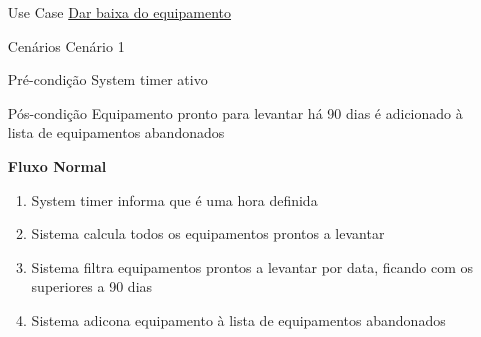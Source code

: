\documentclass[../relatorio.tex]{subfiles}
\begin{document}
\begin{itemize}
    \item[Use Case] {\underline{Dar baixa do equipamento}}
    \item[Cenários] {Cenário 1}
    \item[Pré-condição] {System timer ativo}
    \item[Pós-condição] {Equipamento pronto para levantar há 90 dias é adicionado à lista de equipamentos abandonados}
          \begin{flushleft}
              \textbf{Fluxo Normal}
          \end{flushleft}
          \begin{enumerate}
              \item System timer informa que é uma hora definida
              \item Sistema calcula todos os equipamentos prontos a levantar
              \item Sistema filtra equipamentos prontos a levantar por data, ficando com os superiores a 90 dias
              \item Sistema adicona equipamento à lista de equipamentos abandonados
          \end{enumerate}
\end{itemize}
\end{document}
